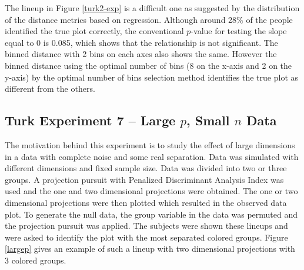 \documentclass[12]{article}
\begin{document}
The lineup in Figure \ref{turk2-exp} is a difficult one as suggested by the distribution of the distance metrics based on regression. Although around 28\% of the people identified the true plot correctly, the conventional $p$-value for testing the slope equal to 0 is 0.085, which shows that the relationship is not significant. The binned distance with 2 bins on each axes also shows the same. However the binned distance using the optimal number of bins (8 on the x-axis and 2 on the y-axis) by the optimal number of bins selection method identifies the true plot as different from the others. 

%




\subsection{Turk Experiment 7 -- Large $p$, Small $n$ Data}

The motivation behind this experiment is to study the effect of large dimensions in a data with complete noise and some real separation. Data was simulated with different dimensions and fixed sample size. Data was divided into two or three groups. A projection pursuit with Penalized Discriminant Analysis Index was used and the one and two dimensional projections were obtained. The one or two dimensional projections were then plotted which resulted in the observed data plot. To generate the null data, the group variable in the data was permuted and the projection pursuit was applied. The subjects were shown these lineups and were asked to identify the plot with the most separated colored groups. Figure \ref{largep} gives an example of such a lineup with two dimensional projections with 3 colored groups. 
\end{document}
